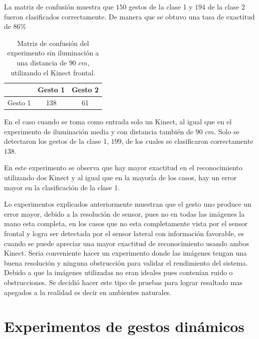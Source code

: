 \begin{itemize}
La matriz de confusión muestra que $150$ gestos de la clase 1 y $194$ de la clase 2 fueron clasificados correctamente. De manera que se obtuvo una tasa de exactitud de $86 \%$ 

\begin{table}[h!] 
\begin{center}
\caption{Matriz de confusión del experimento sin iluminación a una distancia de $90$ $cm$, utilizando el Kinect frontal.}
\label{table:90LnoK1}
\begin{tabular}{ r || c | c |} 
 
        & Gesto 1 & Gesto 2 \\ \hline \hline  
Gesto 1 & 138     &  61     \\ \hline  
\end{tabular}
\end{center} 
\end{table} 

En el caso cuando se toma como entrada solo un Kinect, al igual que en el experimento de iluminación media y con distancia también de $90$ $cm$. Solo se detectaron los gestos de la clase 1, $199$, de los cuales se clasificaron correctamente $138$. 

En este experimento se observa que hay mayor exactitud en el reconocimiento utilizando dos Kinect y al igual que en la mayoría de los casos, hay un error mayor en la clasificación de la clase 1. 


\end{itemize}

Lo experimentos explicados anteriormente muestran que el gesto uno produce un error mayor, debido a la resolución de sensor, pues no en todas las imágenes la mano esta completa, en los casos que no esta completamente vista por el sensor frontal y logra ser detectada por el sensor lateral con información favorable, es cuando se puede apreciar una mayor exactitud de reconocimiento usando ambos Kinect. 
Seria conveniente hacer un experimento donde las imágenes tengan una buena resolución y ninguna obstrucción para validar el rendimiento del sistema. Debido a que la imágenes utilizadas no eran ideales pues contenían  ruido o obstrucciones. Se decidió hacer este tipo de pruebas para lograr resaltado mas apegados a la realidad es decir en ambientes naturales. 
  



\section{Experimentos de gestos dinámicos}\label{TestDinamicGestures} 

